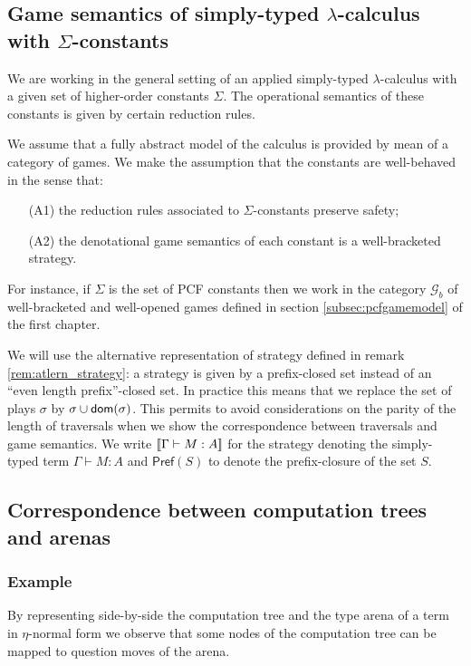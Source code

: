 \subsection{Game semantics of simply-typed $\lambda$-calculus with $\Sigma$-constants}

We are working in the general setting of an applied simply-typed $\lambda$-calculus with a given set of higher-order constants $\Sigma$.
The operational semantics of these constants is given by certain reduction rules.

We assume that a fully abstract model of the calculus is provided by mean of a category of games.
We make the assumption that the constants are well-behaved in the sense that:
\begin{enumerate}
\item[(A1)] the reduction rules associated to $\Sigma$-constants preserve safety;
\item[(A2)] the denotational game semantics of each constant is a well-bracketed strategy.
\end{enumerate}

For instance, if $\Sigma$ is the set of PCF constants then we work in the category $\mathcal{G}_{b}$
of well-bracketed and well-opened games defined in section \ref{subsec:pcfgamemodel} of the first chapter.

We will use the alternative representation of strategy defined in remark \ref{rem:atlern_strategy}: a
strategy is given by a prefix-closed set instead of an ``even length
prefix''-closed set. In practice this means that we replace the set
of plays $\sigma$ by $\sigma \cup \textsf{dom}(\sigma)$. This
permits to avoid considerations on the parity of the length of
traversals when we show the correspondence between traversals and
game semantics. We write ${[\![ \Gamma \vdash M : A ]\!]}$ for the strategy denoting the simply-typed term
$\Gamma \vdash M : A$ and $\textsf{Pref}(S)$ to denote the
prefix-closure of the set $S$.


\subsection{Correspondence between computation trees and arenas}

\subsubsection{Example}
By representing side-by-side the computation tree and the type arena of a term in $\eta$-normal form we observe
that some nodes of the computation tree can be mapped to question moves of the arena.

